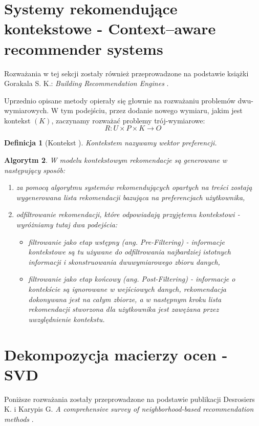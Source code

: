 \documentclass[12pt,a4paper]{report}
\newtheorem{df}{Definicja}[chapter]
\newtheorem{algorytm}[df]{Algorytm}
\newcommand{\setUzytkownicy}{\mathit{U}}
\newcommand{\setPrzedmioty}{\mathit{P}}
\newcommand{\setOceny}{\mathit{O}}
\newcommand{\setKontekst}{\mathit{K}}
\begin{document}
\section{Systemy rekomendujące kontekstowe - Context–aware recommender systems}
Rozważania w tej sekcji zostały również przeprowadzone na podstawie książki Gorakala S. K.: \textit{Building Recommendation Engines} {\citep[Sec 3]{bre}}.
\bigskip

Uprzednio opisane metody opierały się głownie na rozważaniu problemów dwu-wymiarowych. W tym podejściu, przez dodanie nowego wymiaru, jakim jest kontekst $(K)$, zaczynamy rozważać problemy trój-wymiarowe:
$$
R: \setUzytkownicy \times \setPrzedmioty \times \setKontekst  \rightarrow \setOceny
$$
\begin{df}[Kontekst {\citep[Sec 3.3.1.1]{rsh}}]
Kontekstem nazywamy wektor preferencji.
\end{df}

\begin{algorytm}
W modelu kontekstowym rekomendacje są generowane w następujący sposób:
\begin{enumerate}
\item za pomocą algorytmu systemów rekomendujących opartych na treści zostają wygenerowana lista rekomendacji bazująca na  preferencjach użytkownika,
\item odfiltrowanie rekomendacji, które odpowiadają przyjętemu kontekstowi - 
wyróżniamy tutaj dwa podejścia:
\begin{itemize}
\item filtrowanie jako etap wstępny (ang. Pre-Filtering) - informacje kontekstowe są tu używane do odfiltrowania najbardziej istotnych informacji i skonstruowania dwuwymiarowego zbioru danych,
\item filtrowanie jako etap końcowy (ang. Post-Filtering) - informacje o kontekście są ignorowane w wejściowych danych, rekomendacja dokonywana jest na całym zbiorze, a w następnym kroku lista rekomendacji stworzona dla użytkownika jest zawężana przez uwzględnienie kontekstu.
\end{itemize}
\end{enumerate}
\end{algorytm}

\section{Dekompozycja macierzy ocen - SVD}
Poniższe rozważania zostały przeprowadzone na podstawie publikacji Desrosiers K. i Karypis G. \textit{A comprehensive survey of neighborhood-based recommendation methods} {\citep[Sec 4.1.1]{acsonbrs}}.
\end{document}
